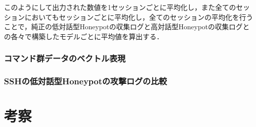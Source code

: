 このようにして出力された数値を1セッションごとに平均化し，また全てのセッションにおいてもセッションごとに平均化し，全てのセッションの平均化を行うことで，純正の低対話型Honeypotの収集ログと高対話型Honeypotの収集ログとの各々で構築したモデルごとに平均値を算出する．


\subsubsection{コマンド群データのベクトル表現}
\label{eval:CommandVector}

\subsubsection{SSHの低対話型Honeypotの攻撃ログの比較}
\label{eval:CompareLog}


\section{考察}
\label{eval:implkosatu}

